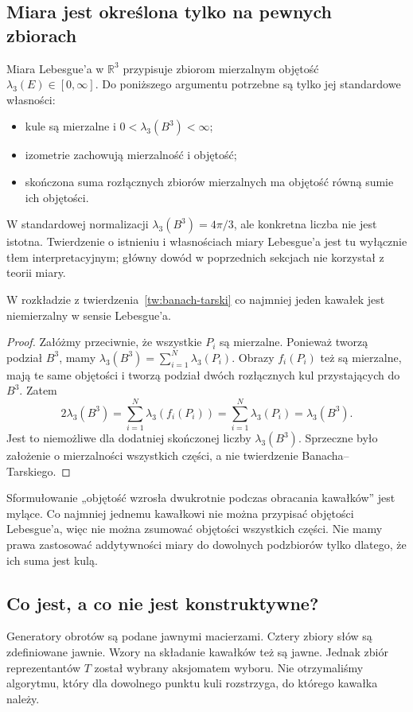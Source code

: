 \subsection{Miara jest określona tylko na pewnych zbiorach}
Miara Lebesgue'a w $\mathbb R^3$ przypisuje zbiorom mierzalnym objętość $\lambda_3(E)\in[0,\infty]$. Do poniższego argumentu potrzebne są tylko jej standardowe własności:
\begin{itemize}
\item kule są mierzalne i $0<\lambda_3(B^3)<\infty$;
\item izometrie zachowują mierzalność i objętość;
\item skończona suma rozłącznych zbiorów mierzalnych ma objętość równą sumie ich objętości.
\end{itemize}
W standardowej normalizacji $\lambda_3(B^3)=4\pi/3$, ale konkretna liczba nie jest istotna. Twierdzenie o istnieniu i własnościach miary Lebesgue'a jest tu wyłącznie tłem interpretacyjnym; główny dowód w poprzednich sekcjach nie korzystał z teorii miary.
\begin{stwierdzenie}\label{st:niemierzalnosc}
W rozkładzie z twierdzenia~\ref{tw:banach-tarski} co najmniej jeden kawałek jest niemierzalny w sensie Lebesgue'a.
\end{stwierdzenie}
\begin{proof}
Załóżmy przeciwnie, że wszystkie $P_i$ są mierzalne. Ponieważ tworzą podział $B^3$, mamy $\lambda_3(B^3)=\sum_{i=1}^{N}\lambda_3(P_i)$. Obrazy $f_i(P_i)$ też są mierzalne, mają te same objętości i tworzą podział dwóch rozłącznych kul przystających do $B^3$. Zatem
\[
 2\lambda_3(B^3)=\sum_{i=1}^{N}\lambda_3(f_i(P_i))=
 \sum_{i=1}^{N}\lambda_3(P_i)=\lambda_3(B^3).
\]
Jest to niemożliwe dla dodatniej skończonej liczby $\lambda_3(B^3)$. Sprzeczne było założenie o mierzalności wszystkich części, a nie twierdzenie Banacha--Tarskiego.
\end{proof}
\begin{uwaga}
Sformułowanie „objętość wzrosła dwukrotnie podczas obracania kawałków” jest mylące. Co najmniej jednemu kawałkowi nie można przypisać objętości Lebesgue'a, więc nie można zsumować objętości wszystkich części. Nie mamy prawa zastosować addytywności miary do dowolnych podzbiorów tylko dlatego, że ich suma jest kulą.
\end{uwaga}

\subsection{Co jest, a co nie jest konstruktywne?}
Generatory obrotów są podane jawnymi macierzami. Cztery zbiory słów są zdefiniowane jawnie. Wzory na składanie kawałków też są jawne. Jednak zbiór reprezentantów $T$ został wybrany aksjomatem wyboru. Nie otrzymaliśmy algorytmu, który dla dowolnego punktu kuli rozstrzyga, do którego kawałka należy.

